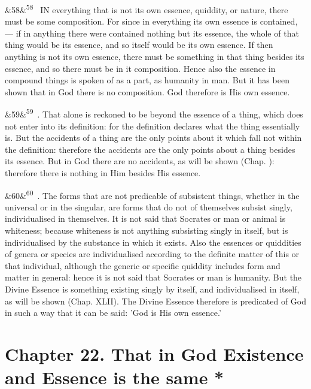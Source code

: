 \documentclass[12pt]{article}
\newcommand{\para}[1][]{\par\noindent\ifx&#1&\else\textsuperscript{\footnotesize #1}~\fi}
\begin{document}
\para[58] IN everything that is not its own essence, quiddity, or nature, there must be some composition. For since in everything its own essence is contained, --- if in anything there were contained nothing but its essence, the whole of that thing would be its essence, and so itself would be its own essence. If then anything is not its own essence, there must be something in that thing besides its essence, and so there must be in it composition. Hence also the essence in compound things is spoken of as a part, as humanity in man. But it has been shown that in God there is no composition. God therefore is His own essence.

\para[59] 2. That alone is reckoned to be beyond the essence of a thing, which does not enter into its definition: for the definition declares what the thing essentially is. But the accidents of a thing are the only points about it which fall not within the definition: therefore the accidents are the only points about a thing besides its essence. But in God there are no accidents, as will be shown (Chap. ): therefore there is nothing in Him besides His essence.

\para[60] 3. The forms that are not predicable of subsistent things, whether in the universal or in the singular, are forms that do not of themselves subsist singly, individualised in themselves. It is not said that Socrates or man or animal is whiteness; because whiteness is not anything subsisting singly in itself, but is individualised by the substance in which it exists. Also the essences or quiddities of genera or species are individualised according to the definite matter of this or that individual, although the generic or specific quiddity includes form and matter in general: hence it is not said that Socrates or man is humanity. But the Divine Essence is something existing singly by itself, and individualised in itself, as will be shown (Chap. XLII). The Divine Essence therefore is predicated of God in such a way that it can be said: 'God is His own essence.'

\section*{Chapter 22. That in God Existence and Essence is the same *}
\end{document}
